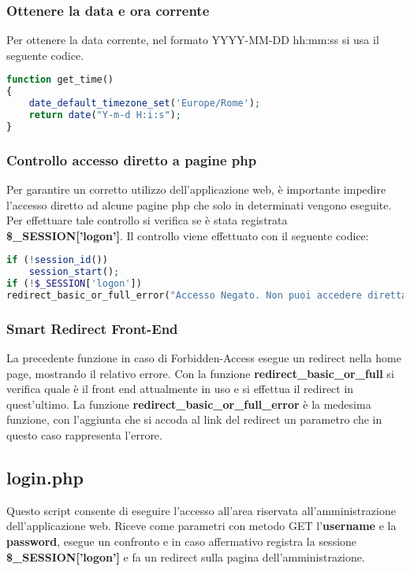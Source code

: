 \subsubsection{Ottenere la data e ora corrente}
Per ottenere la data corrente, nel formato YYYY-MM-DD hh:mm:ss si usa il seguente codice.
\begin{lstlisting}[language=PHP]
function get_time()
{
	date_default_timezone_set('Europe/Rome');
	return date("Y-m-d H:i:s");
}
\end{lstlisting}

\subsubsection{Controllo accesso diretto a pagine php}
Per garantire un corretto utilizzo dell'applicazione web, è importante impedire l'accesso diretto ad alcune pagine php che solo in determinati vengono eseguite. \newline
Per effettuare tale controllo si verifica se è stata registrata \textbf{\$\_SESSION['logon']}.
\newline
Il controllo viene effettuato con il seguente codice:

\begin{lstlisting}[language=PHP]
if (!session_id()) 
	session_start();
if (!$_SESSION['logon'])
redirect_basic_or_full_error("Accesso Negato. Non puoi accedere direttamente a questa pagina.");
\end{lstlisting}

\subsubsection{Smart Redirect Front-End}
La precedente funzione in caso di Forbidden-Access esegue un redirect nella home page, mostrando il relativo errore. \newline
Con la funzione \textbf{redirect\_basic\_or\_full} si verifica quale è il front end attualmente in uso e si effettua il redirect in quest'ultimo. \newline
La funzione \textbf{redirect\_basic\_or\_full\_error} è la medesima funzione, con l'aggiunta che si accoda al link del redirect un parametro che in questo caso rappresenta l'errore.

\subsection{login.php}
Questo script consente di eseguire l'accesso all'area riservata all'amministrazione dell'applicazione web. \newline
Riceve come parametri con metodo GET l'\textbf{username} e la \textbf{password}, esegue un confronto e in caso affermativo registra la sessione \textbf{\$\_SESSION['logon']} e fa un redirect sulla pagina dell'amministrazione. 

